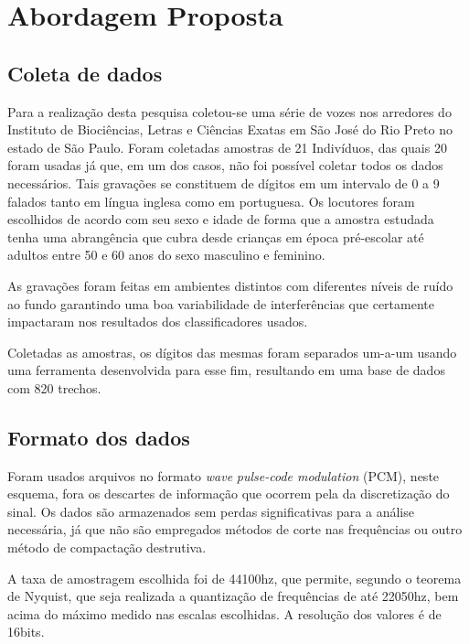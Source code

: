 \chapter{Abordagem Proposta} \label{chap:propApproach}
	\begin{myenv}{1.5}
		\section{Coleta de dados}
			\par Para a realização desta pesquisa coletou-se uma série de vozes nos arredores do Instituto de Biociências, Letras e Ciências Exatas em São José do Rio Preto no estado de São Paulo. Foram coletadas amostras de 21 Indivíduos, das quais 20 foram usadas já que, em um dos casos, não foi possível coletar todos os dados necessários. Tais gravações se constituem de dígitos em um intervalo de 0 a 9 falados tanto em língua inglesa como em portuguesa. Os locutores foram escolhidos de acordo com seu sexo e idade de forma que a amostra estudada tenha uma abrangência que cubra desde crianças em época pré-escolar até adultos entre 50 e 60 anos do sexo masculino e feminino.
						
			\par As gravações foram feitas em ambientes distintos com diferentes níveis de ruído ao fundo garantindo uma boa variabilidade de interferências que certamente impactaram nos resultados dos classificadores usados.
			
			\par Coletadas as amostras, os dígitos das mesmas foram separados um-a-um usando uma ferramenta desenvolvida para esse fim, resultando em uma base de dados com 820 trechos.
			
		\section{Formato dos dados}
			\par Foram usados arquivos no formato \textit{wave} \textit{pulse-code modulation} (PCM), neste esquema, fora os descartes de informação que ocorrem pela da discretização do sinal. Os dados são armazenados sem perdas significativas para a análise necessária, já que não são empregados métodos de corte nas frequências ou outro método de compactação destrutiva.
			
			\par A taxa de amostragem escolhida foi de 44100hz, que permite, segundo o teorema de Nyquist, que seja realizada a quantização de frequências de até 22050hz, bem acima do máximo medido nas escalas escolhidas. A resolução dos valores é de 16bits.
			

\end{myenv}
